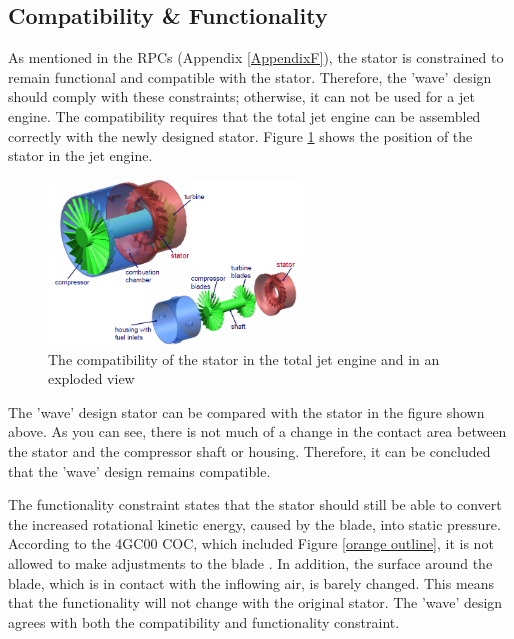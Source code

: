 \subsection{Compatibility \& Functionality}
As mentioned in the RPCs (Appendix \ref{AppendixF}), the stator is constrained to remain functional and compatible with the stator. Therefore, the 'wave' design should comply with these constraints; otherwise, it can not be used for a jet engine. The compatibility requires that the total jet engine can be assembled correctly with the newly designed stator. Figure \ref{fig:compatible} shows the position of the stator in the jet engine.
\begin{figure}[H]
\centering
\includegraphics[width=0.6\textwidth]{Figures/compatible.png}
\caption{The compatibility of the stator in the total jet engine and in an exploded view \cite{COC}}
\label{fig:compatible}
\end{figure}
The 'wave' design stator can be compared with the stator in the figure shown above. As you can see, there is not much of a change in the contact area between the stator and the compressor shaft or housing. Therefore, it can be concluded that the 'wave' design remains compatible.

The functionality constraint states that the stator should still be able to convert the increased rotational kinetic energy, caused by the blade, into static pressure. According to the 4GC00 COC, which included Figure \ref{orange outline}, it is not allowed to make adjustments to the blade \cite{COC}. In addition, the surface around the blade, which is in contact with the inflowing air, is barely changed. This means that the functionality will not change with the original stator. The 'wave' design agrees with both the compatibility and functionality constraint.  
\newpage